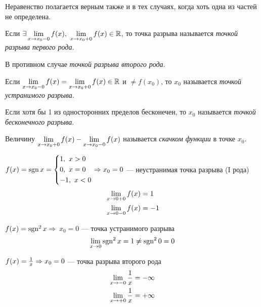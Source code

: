 \begin{note}
	Неравенство полагается верным также и в тех случаях, когда хоть одна из частей не определена.
\end{note}

\begin{definition}
	Если $\exists \liml_{x \to x_0-0} f(x),\ \liml_{x \to x_0+0} f(x) \in \R$, то точка разрыва называется \textit{точкой разрыва первого рода}.
	
	В противном случае \textit{точкой разрыва второго рода}.
\end{definition}

\begin{definition}
	Если $\lim\limits_{x \to x_0-0} f(x) = \lim\limits_{x \to x_0+0} f(x) \in \mathbb{R}$ и $\neq f(x_0)$, то $x_0$ называется \textit{точкой устранимого разрыва}.
\end{definition}

\begin{definition}
	Если хотя бы 1 из односторонних пределов бесконечен, то $x_0$ называется \textit{точкой бесконечного разрыва}.
\end{definition}

\begin{definition}
	Величину $\lim\limits_{x \to x_0+0} f(x) - \lim\limits_{x \to x_0-0} f(x)$ называется \textit{скачком функции} в точке $x_0$.
\end{definition}

\begin{example}
	$f(x) = \operatorname{sgn} x = \left\{\begin{aligned}&{1,\ x > 0} \\ &{0,\ x = 0} \\ &{-1,\ x < 0}\end{aligned}\right.
	\Rightarrow x_0 = 0$ --- неустранимая точка разрыва (I рода)
	\begin{align*}
		&\lim\limits_{x \to 0 + 0} f(x) = 1
		\\
		&\lim\limits_{x \to 0 - 0} f(x) = -1
	\end{align*}
\end{example}

\begin{example}
	$f(x) = \operatorname{sgn}^2 x \Rightarrow $  $x_0 = 0$ --- точка устранимого разрыва
	$$
		\lim\limits_{x \to 0} \operatorname{sgn}^2 x = 1 \neq \operatorname{sgn}^2 0 = 0
	$$
\end{example}

\begin{example}
	$f(x) = \frac{1}{x} \Rightarrow x_0 = 0$ --- точка разрыва второго рода 
	\begin{align*}
		\lim\limits_{x \to -0} \frac{\displaystyle 1}{\displaystyle x} = -\infty
		\\
		\lim\limits_{x \to +0} \frac{\displaystyle 1}{\displaystyle x} = +\infty
	\end{align*}
\end{example}

